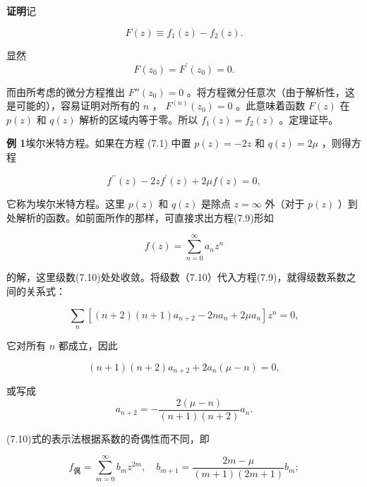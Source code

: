 \textbf{证明}\quad 记

\begin{equation*}
F (z) \equiv f _ {1} (z) - f _ {2} (z).
\end{equation*}

显然
\begin{equation*}
F (z _ {0}) = F ^ {\prime} (z _ {0}) = 0.
\end{equation*}

而由所考虑的微分方程推出 $F''(z_0)=0$ 。将方程微分任意次（由于解析性，这是可能的），容易证明对所有的 $n$ ， $F^{(n)}(z_0) = 0$ 。此意味着函数 $F(z)$ 在 $p(z)$ 和 $q(z)$ 解析的区域内等于零。所以 $f_{1}(z) = f_{2}(z)$ 。定理证毕。

\textbf{例 1}\quad 埃尔米特方程。如果在方程 (7.1) 中置 $p(z) = -2z$ 和 $q(z) = 2\mu$ ，则得方程

\begin{equation*}
f ^ {\prime \prime} (z) - 2 z f ^ {\prime} (z) + 2 \mu f (z) = 0,\tag{7.9}
\end{equation*}

它称为埃尔米特方程。这里 $p(z)$ 和 $q(z)$ 是除点 $z = \infty$ 外（对于 $p(z)$ ）到处解析的函数。如前面所作的那样，可直接求出方程(7.9)形如

\begin{equation*}
f (z) = \sum_ {n = 0} ^ {\infty} a _ {n} z ^ {n}\tag{7.10}
\end{equation*}

的解，这里级数(7.10)处处收敛。将级数（7.10）代入方程(7.9)，就得级数系数之间的关系式：

\begin{equation*}
\sum_ {n} [ (n + 2) (n + 1) a _ {n + 2} - 2 n a _ {n} + 2 \mu a _ {n} ] z ^ {n} = 0,
\end{equation*}

它对所有 $n$ 都成立，因此

\begin{equation*}
(n + 1) (n + 2) a _ {n + 2} + 2 a _ {n} (\mu - n) = 0,
\end{equation*}

或写成
\begin{equation*}
a _ {n + 2} = - \frac {2 (\mu - n)}{(n + 1) (n + 2)} a _ {n}.
\end{equation*}

(7.10)式的表示法根据系数的奇偶性而不同，即

\begin{equation*}
f _ {\text {偶}} = \sum_ {m = 0} ^ {\infty} b _ {m} z ^ {2 m}, \quad b _ {m + 1} = \frac {2 m - \mu}{(m + 1) (2 m + 1)} b _ {m};\tag{7.11a}
\end{equation*}

